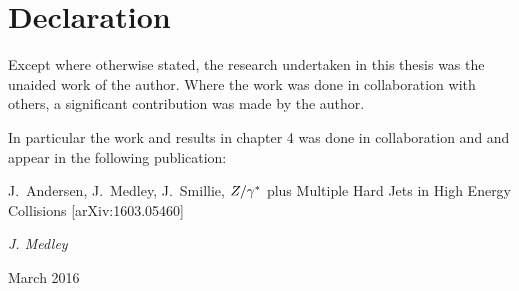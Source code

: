 \chapter*{Declaration}

\normalsize
Except where otherwise stated, the research undertaken in this thesis
was the unaided work of the author. Where the work was done in collaboration
with others, a significant contribution was made by the author.

In particular the work and results in chapter 4 was done in collaboration
and and appear in the following publication:

\cite{ZPaper} J.~Andersen, J.~Medley, J.~Smillie, $Z/\gamma^*$ plus Multiple Hard Jets
in High Energy Collisions [arXiv:1603.05460]

\vspace{20mm}
\hfill {\it J. Medley}

\hfill March 2016


